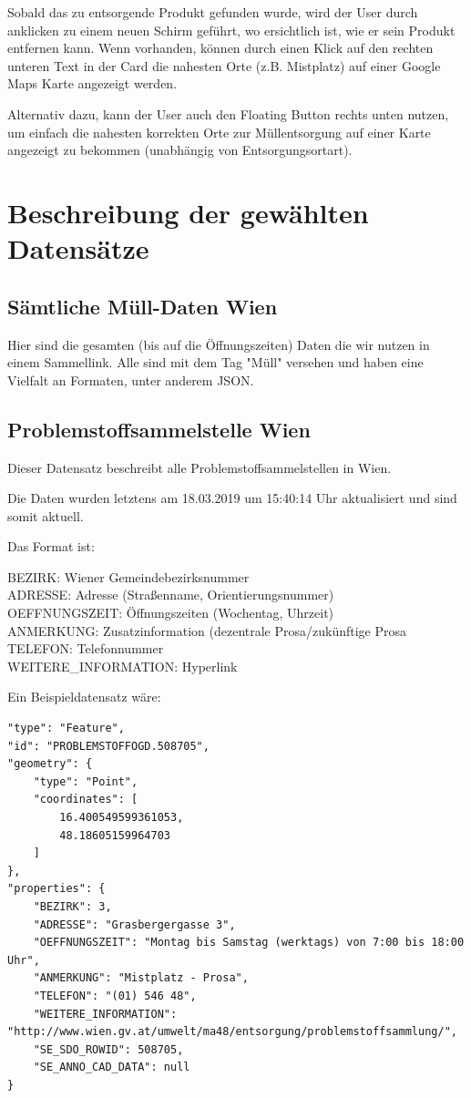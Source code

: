 \documentclass[12pt, a4paper]{scrreprt}
\begin{document}
Sobald das zu entsorgende Produkt gefunden wurde, wird der User durch anklicken zu einem neuen Schirm geführt, wo ersichtlich ist, wie er sein Produkt entfernen kann. Wenn vorhanden, können durch einen Klick auf den rechten unteren Text in der Card die nahesten Orte (z.B. Mistplatz) auf einer Google Maps Karte angezeigt werden.

Alternativ dazu, kann der User auch den Floating Button rechts unten nutzen, um einfach die nahesten korrekten Orte zur Müllentsorgung auf einer Karte angezeigt zu bekommen (unabhängig von Entsorgungsortart).

\section{Beschreibung der gewählten Datensätze}
\subsection{Sämtliche Müll-Daten Wien  \cite{alleMuell}}
    Hier sind die gesamten (bis auf die Öffnungszeiten) Daten die wir nutzen in einem Sammellink. Alle sind mit dem Tag "Müll" versehen und haben eine Vielfalt an Formaten, unter anderem JSON.
\subsection{Problemstoffsammelstelle Wien \cite{problemstoffsammelstellen}}
    Dieser Datensatz beschreibt alle Problemstoffsammelstellen in Wien.

    Die Daten wurden letztens am 18.03.2019 um 15:40:14 Uhr aktualisiert und sind somit aktuell.

    Das Format ist:
    \begin{tcolorbox}
        BEZIRK: Wiener Gemeindebezirksnummer\\
        ADRESSE: Adresse (Straßenname, Orientierungsnummer)\\
        OEFFNUNGSZEIT: Öffnungszeiten (Wochentag, Uhrzeit)\\
        ANMERKUNG: Zusatzinformation (dezentrale Prosa/zukünftige Prosa\\
        TELEFON: Telefonnummer\\
        WEITERE\_INFORMATION: Hyperlink 
    \end{tcolorbox}
    
    Ein Beispieldatensatz wäre:
    \begin{lstlisting}
"type": "Feature",
"id": "PROBLEMSTOFFOGD.508705",
"geometry": {
    "type": "Point",
    "coordinates": [
        16.400549599361053,
        48.18605159964703
    ]
},
"properties": {
    "BEZIRK": 3,
    "ADRESSE": "Grasbergergasse 3",
    "OEFFNUNGSZEIT": "Montag bis Samstag (werktags) von 7:00 bis 18:00 Uhr",
    "ANMERKUNG": "Mistplatz - Prosa",
    "TELEFON": "(01) 546 48",
    "WEITERE_INFORMATION": "http://www.wien.gv.at/umwelt/ma48/entsorgung/problemstoffsammlung/",
    "SE_SDO_ROWID": 508705,
    "SE_ANNO_CAD_DATA": null
}
    \end{lstlisting}
\end{document}

